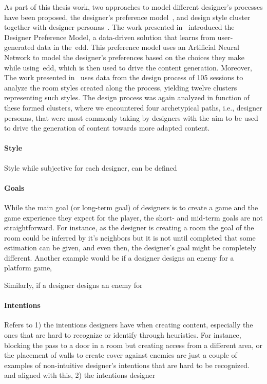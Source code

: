 As part of this thesis work, two approaches to model different designer's processes have been proposed, the designer's preference model~\cite{Alvarez2020-DesignerPreference}, and design style cluster together with designer personas~\cite{alvarez2020-designerpersonas}. The work presented in~\cite{Alvarez2020-DesignerPreference} introduced the Designer Preference Model, a data-driven solution that learns from user-generated data in the~\acrshort{edd}. This preference model uses an Artificial Neural Network to model the designer's preferences based on the choices they make while using~\acrshort{edd}, which is then used to drive the content generation. Moreover, The work presented in~\cite{alvarez2020-designerpersonas} uses data from the design process of 105 sessions to analyze the room styles created along the process, yielding twelve clusters representing such styles. The design process was again analyzed in function of these formed clusters, where we encountered four archetypical paths, i.e., designer personas, that were most commonly taking by designers with the aim to be used to drive the generation of content towards more adapted content. 

\paragraph{Style}

Style while subjective for each designer, can be defined 

\paragraph{Goals}

While the main goal (or long-term goal) of designers is to create a game and the game experience they expect for the player, the short- and mid-term goals are not straightforward. For instance, as the designer is creating a room the goal of the room could be inferred by it's neighbors but it is not until completed that some estimation can be given, and even then, the designer's goal might be completely different. Another example would be if a designer designs an enemy for a platform game, 

Similarly, if a designer designs an enemy for 

\paragraph{Intentions}

Refers to 1) the intentions designers have when creating content, especially the ones that are hard to recognize or identify through heuristics. For instance, blocking the pass to a door in a room but creating access from a different area, or the placement of walls to create cover against enemies are just a couple of examples of non-intuitive designer's intentions that are hard to be recognized. and aligned with this, 2) the intentions designer

